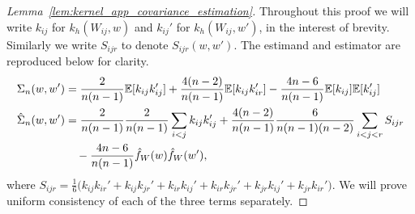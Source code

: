\begin{proof}[Lemma~\ref{lem:kernel_app_covariance_estimation}]

  Throughout this proof we will write
  $k_{i j}$ for $k_h(W_{i j},w)$ and
  $k_{i j}'$ for $k_h(W_{i j},w')$,
  in the interest of brevity.
  Similarly we write $S_{i j r}$ to denote $S_{i j r}(w,w')$.
  The estimand and estimator are reproduced below for clarity.
  \begin{align*}
    \Sigma_n(w,w')
    &=
    \frac{2}{n(n-1)}
    \mathbb{E}[k_{i j} k_{i j}']
    + \frac{4(n-2)}{n(n-1)}
    \mathbb{E}[k_{i j} k_{i r}']
    - \frac{4n-6}{n(n-1)}
    \mathbb{E}[k_{i j}]
    \mathbb{E}[k_{i j}'] \\
    \hat \Sigma_n(w,w')
    &=
    \frac{2}{n(n-1)}
    \frac{2}{n(n-1)}
    \sum_{i<j}
    k_{i j}
    k_{i j}'
    +
    \frac{4(n-2)}{n(n-1)}
    \frac{6}{n(n-1)(n-2)}
    \sum_{i<j<r}
    S_{i j r} \\
    &\quad-
    \frac{4n-6}{n(n-1)}
    \hat f_W(w)
    \hat f_W(w'),
  \end{align*}
  where
  $S_{i j r} = \frac{1}{6}
  \big( k_{i j} k_{i r}'
    + k_{i j} k_{jr}'
    + k_{i r} k_{i j}'
    + k_{i r} k_{jr}'
    + k_{jr} k_{i j}'
    + k_{jr} k_{i r}'
  \big).$
  We will prove uniform consistency of each of the three terms separately.



\end{proof}
